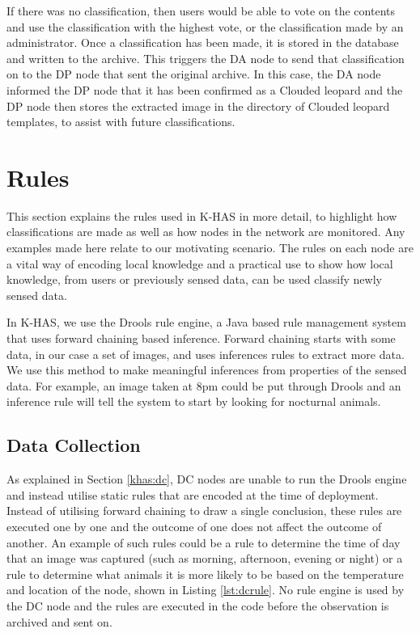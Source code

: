			If there was no classification, then users would be able to vote on the contents and use the classification with the highest vote, or the classification made by an administrator. Once a classification has been made, it is stored in the database and written to the archive. This triggers the DA node to send that classification on to the DP node that sent the original archive. In this case, the DA node informed the DP node that it has been confirmed as a Clouded leopard and the DP node then stores the extracted image in the directory of Clouded leopard templates, to assist with future classifications.
			
			
	\section{Rules}
		This section explains the rules used in K-HAS in more detail, to highlight how classifications are made as well as how nodes in the network are monitored. Any examples made here relate to our motivating scenario. The rules on each node are a vital way of encoding local knowledge and a practical use to show how local knowledge, from users or previously sensed data, can be used classify newly sensed data.
		
		In K-HAS, we use the Drools rule engine, a Java based rule management system that uses forward chaining based inference. Forward chaining starts with some data, in our case a set of images, and uses inferences rules to extract more data. We use this method to make meaningful inferences from properties of the sensed data. For example, an image taken at 8pm could be put through Drools and an inference rule will tell the system to start by looking for nocturnal animals.
		
	\subsection{Data Collection}			
		As explained in Section \ref{khas:dc}, DC nodes are unable to run the Drools engine and instead utilise static rules that are encoded at the time of deployment. Instead of utilising forward chaining to draw a single conclusion, these rules are executed one by one and the outcome of one does not affect the outcome of another. An example of such rules could be a rule to determine the time of day that an image was captured (such as morning, afternoon, evening or night) or a rule to determine what animals it is more likely to be based on the temperature and location of the node, shown in Listing \ref{lst:dcrule}. No rule engine is used by the DC node and the rules are executed in the code before the observation is archived and sent on.
		

